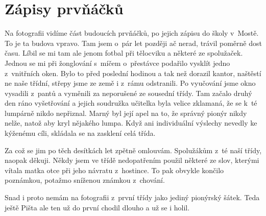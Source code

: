 
\chapter{Zápisy prvňáčků}

Na fotografii vidíme část budoucích prvňáčků, po jejich zápisu do školy
v~Mostě. To je ta budova vpravo. Tam jsem o~pár let později ač nerad, trávil
poměrně dost času. Líbil se mi tam ale jenom fotbal při tělocviku a některé ze
spolužaček. Jednou se mi při žonglování s~míčem o~přestávce podařilo vysklít
jedno z~vnitřních oken. Bylo to před poslední hodinou a tak než dorazil kantor,
naštěstí ne naše třídní, střepy jsme ze země i z~rámu odstranili. Po vyučování
jsme okno vysadili z~pantů a vyměnili za neporušené ze sousední třídy. Tam
začalo druhý den ráno vyšetřování a jejich soudružka učitelka byla velice
zklamaná, že se k~té lumpárně nikdo nepřiznal. Marný byl její apel na to, že
správný pionýr nikdy nelže, natož aby kryl nějakého lumpa. Když ani
individuální výslechy nevedly ke kýženému cíli, skládala se na zasklení celá
třída.

Za což se jim po těch desítkách let zpětně omlouvám. Spolužákům z~té naší
třídy, naopak děkuji. Někdy jsem ve třídě nedopatřením použil některé ze slov,
kterými vítala matka otce při jeho návratu z~hostince. To pak obvykle končilo
poznámkou, potažmo sníženou známkou z~chování.

Snad i proto nemám na fotografii z~první třídy jako jediný pionýrský šátek.
Teda ještě Pišta ale ten už do první chodil dlouho a už se i holil.

